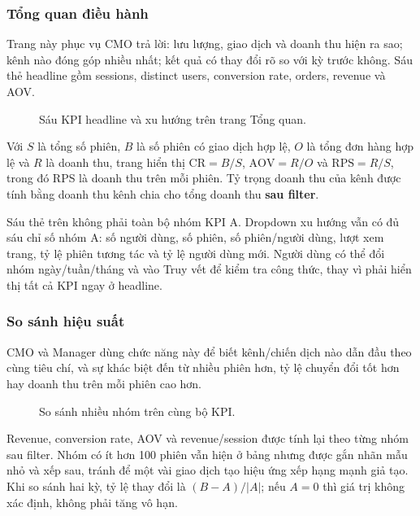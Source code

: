 \subsubsection{Tổng quan điều hành}

Trang này phục vụ CMO trả lời: lưu lượng, giao dịch và doanh thu hiện ra sao; kênh nào đóng góp nhiều nhất; kết quả có thay đổi rõ so với kỳ trước không. Sáu thẻ headline gồm sessions, distinct users, conversion rate, orders, revenue và AOV. \medskip

\begin{figure}[H]
  \centering
  \caption{Sáu KPI headline và xu hướng trên trang Tổng quan.}
  \label{fig:ui-overview}
\end{figure}

Với $S$ là tổng số phiên, $B$ là số phiên có giao dịch hợp lệ, $O$ là tổng đơn hàng hợp lệ và $R$ là doanh thu, trang hiển thị $\mathrm{CR}=B/S$, $\mathrm{AOV}=R/O$ và $\mathrm{RPS}=R/S$, trong đó RPS là doanh thu trên mỗi phiên. Tỷ trọng doanh thu của kênh được tính bằng doanh thu kênh chia cho tổng doanh thu \textbf{sau filter}. \medskip

Sáu thẻ trên không phải toàn bộ nhóm KPI A. Dropdown xu hướng vẫn có đủ sáu chỉ số nhóm A: số người dùng, số phiên, số phiên/người dùng, lượt xem trang, tỷ lệ phiên tương tác và tỷ lệ người dùng mới. Người dùng có thể đổi nhóm ngày/tuần/tháng và vào Truy vết để kiểm tra công thức, thay vì phải hiển thị tất cả KPI ngay ở headline.

\subsubsection{So sánh hiệu suất}

CMO và Manager dùng chức năng này để biết kênh/chiến dịch nào dẫn đầu theo cùng tiêu chí, và sự khác biệt đến từ nhiều phiên hơn, tỷ lệ chuyển đổi tốt hơn hay doanh thu trên mỗi phiên cao hơn.

\begin{figure}[H]
  \centering
  \caption{So sánh nhiều nhóm trên cùng bộ KPI.}
  \label{fig:ui-compare-groups}
\end{figure}

Revenue, conversion rate, AOV và revenue/session được tính lại theo từng nhóm sau filter. Nhóm có ít hơn 100 phiên vẫn hiện ở bảng nhưng được gắn nhãn mẫu nhỏ và xếp sau, tránh để một vài giao dịch tạo hiệu ứng xếp hạng mạnh giả tạo. Khi so sánh hai kỳ, tỷ lệ thay đổi là $(B-A)/|A|$; nếu $A=0$ thì giá trị không xác định, không phải tăng vô hạn.

